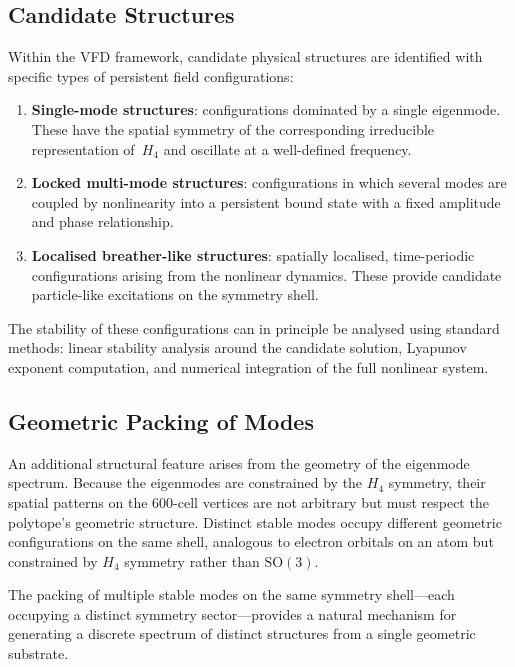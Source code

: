 \documentclass[12pt,a4paper]{article}
\newcommand{\Hfour}{H_4}
\begin{document}
\subsection{Candidate Structures}

Within the VFD framework, candidate physical structures are identified with
specific types of persistent field configurations:

\begin{enumerate}[nosep]
  \item \textbf{Single-mode structures}: configurations dominated by a single
    eigenmode.  These have the spatial symmetry of the corresponding
    irreducible representation of~$\Hfour$ and oscillate at a well-defined
    frequency.

  \item \textbf{Locked multi-mode structures}: configurations in which several
    modes are coupled by nonlinearity into a persistent bound state with a
    fixed amplitude and phase relationship.

  \item \textbf{Localised breather-like structures}: spatially localised,
    time-periodic configurations arising from the nonlinear dynamics.  These
    provide candidate particle-like excitations on the symmetry shell.
\end{enumerate}

The stability of these configurations can in principle be analysed using
standard methods: linear stability analysis around the candidate solution,
Lyapunov exponent computation, and numerical integration of the full nonlinear
system.

\subsection{Geometric Packing of Modes}

An additional structural feature arises from the geometry of the eigenmode
spectrum.  Because the eigenmodes are constrained by the $\Hfour$ symmetry,
their spatial patterns on the 600-cell vertices are not arbitrary but must
respect the polytope's geometric structure.  Distinct stable modes occupy
different geometric configurations on the same shell, analogous to electron
orbitals on an atom but constrained by $\Hfour$ symmetry rather than
$\mathrm{SO}(3)$.

The packing of multiple stable modes on the same symmetry shell---each
occupying a distinct symmetry sector---provides a natural mechanism for
generating a discrete spectrum of distinct structures from a single geometric
substrate.
\end{document}
